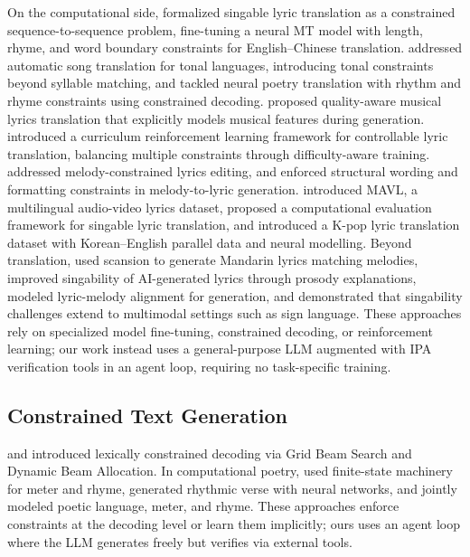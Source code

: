\documentclass[11pt]{article}
\begin{document}
On the computational side, \citet{ou-etal-2023-songs} formalized singable lyric translation as a constrained sequence-to-sequence problem, fine-tuning a neural MT model with length, rhyme, and word boundary constraints for English--Chinese translation.
\citet{guo-etal-2022-automatic} addressed automatic song translation for tonal languages, introducing tonal constraints beyond syllable matching, and \citet{ghazvininejad-etal-2018-neural} tackled neural poetry translation with rhythm and rhyme constraints using constrained decoding.
\citet{ye-etal-2024-sing} proposed quality-aware musical lyrics translation that explicitly models musical features during generation.
\citet{ren-etal-2025-lyricar} introduced a curriculum reinforcement learning framework for controllable lyric translation, balancing multiple constraints through difficulty-aware training.
\citet{zhao-etal-2025-reffly} addressed melody-constrained lyrics editing, and \citet{ou-etal-2023-loaf} enforced structural wording and formatting constraints in melody-to-lyric generation.
\citet{cho-etal-2025-mavl} introduced MAVL, a multilingual audio-video lyrics dataset, \citet{kim-etal-2023-computational} proposed a computational evaluation framework for singable lyric translation, and \citet{kim-etal-2024-kpop} introduced a K-pop lyric translation dataset with Korean--English parallel data and neural modelling.
Beyond translation, \citet{chen-teufel-2024-scansion} used scansion to generate Mandarin lyrics matching melodies, \citet{liang-etal-2024-xai} improved singability of AI-generated lyrics through prosody explanations, \citet{yu-etal-2025-songglm} modeled lyric-melody alignment for generation, and \citet{yoo-etal-2025-elmi} demonstrated that singability challenges extend to multimodal settings such as sign language.
These approaches rely on specialized model fine-tuning, constrained decoding, or reinforcement learning; our work instead uses a general-purpose LLM augmented with IPA verification tools in an agent loop, requiring no task-specific training.

\subsection{Constrained Text Generation}

\citet{hokamp-liu-2017-lexically} and \citet{post-vilar-2018-fast} introduced lexically constrained decoding via Grid Beam Search and Dynamic Beam Allocation.
In computational poetry, \citet{ghazvininejad-etal-2016-generating} used finite-state machinery for meter and rhyme, \citet{hopkins-kiela-2017-automatically} generated rhythmic verse with neural networks, and \citet{lau-etal-2018-deep} jointly modeled poetic language, meter, and rhyme.
These approaches enforce constraints at the decoding level or learn them implicitly; ours uses an agent loop where the LLM generates freely but verifies via external tools.
\end{document}
